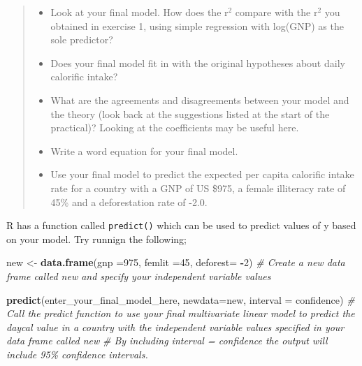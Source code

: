 \documentclass[
]{book}
\newenvironment{Shaded}{\begin{snugshade}}{\end{snugshade}}
\newcommand{\AttributeTok}[1]{\textcolor[rgb]{0.13,0.29,0.53}{#1}}
\newcommand{\CommentTok}[1]{\textcolor[rgb]{0.56,0.35,0.01}{\textit{#1}}}
\newcommand{\DecValTok}[1]{\textcolor[rgb]{0.00,0.00,0.81}{#1}}
\newcommand{\FunctionTok}[1]{\textcolor[rgb]{0.13,0.29,0.53}{\textbf{#1}}}
\newcommand{\NormalTok}[1]{#1}
\newcommand{\OtherTok}[1]{\textcolor[rgb]{0.56,0.35,0.01}{#1}}
\newcommand{\SpecialCharTok}[1]{\textcolor[rgb]{0.81,0.36,0.00}{\textbf{#1}}}
\newcommand{\StringTok}[1]{\textcolor[rgb]{0.31,0.60,0.02}{#1}}
\providecommand{\tightlist}{%
  \setlength{\itemsep}{0pt}\setlength{\parskip}{0pt}}
\begin{document}
\begin{quote}
\begin{itemize}
\tightlist
\item
  Look at your final model. How does the r\(^2\) compare with the r\(^2\) you obtained in exercise 1, using simple regression with log(GNP) as the sole predictor?
\item
  Does your final model fit in with the original hypotheses about daily calorific intake?
\item
  What are the agreements and disagreements between your model and the theory (look back at the suggestions listed at the start of the practical)? Looking at the coefficients may be useful here.
\item
  Write a word equation for your final model.
\item
  Use your final model to predict the expected per capita calorific intake rate for a country with a GNP of US \$975, a female illiteracy rate of 45\% and a deforestation rate of -2.0.
\end{itemize}
\end{quote}

R has a function called \texttt{predict()} which can be used to predict values of y based on your model. Try runnign the following;

\begin{Shaded}
\begin{Highlighting}[]
\NormalTok{new }\OtherTok{\textless{}{-}} \FunctionTok{data.frame}\NormalTok{(}\AttributeTok{gnp =}\DecValTok{975}\NormalTok{, }\AttributeTok{femlit =}\DecValTok{45}\NormalTok{, }\AttributeTok{deforest=} \SpecialCharTok{{-}}\DecValTok{2}\NormalTok{)}
\CommentTok{\# Create a new data frame called \textasciigrave{}new\textasciigrave{} and specify your independent variable values}

\FunctionTok{predict}\NormalTok{(enter\_your\_final\_model\_here, }\AttributeTok{newdata=}\NormalTok{new, }\AttributeTok{interval =} \StringTok{\textquotesingle{}confidence\textquotesingle{}}\NormalTok{)}
\CommentTok{\# Call the predict function to use your final multivariate linear model to predict the daycal value in a country with the independent variable values specified in your data frame called \textasciigrave{}new\textasciigrave{}}
\CommentTok{\# By including interval = \textquotesingle{}confidence\textquotesingle{} the output will include 95\% confidence intervals.}
\end{Highlighting}
\end{Shaded}
\end{document}
